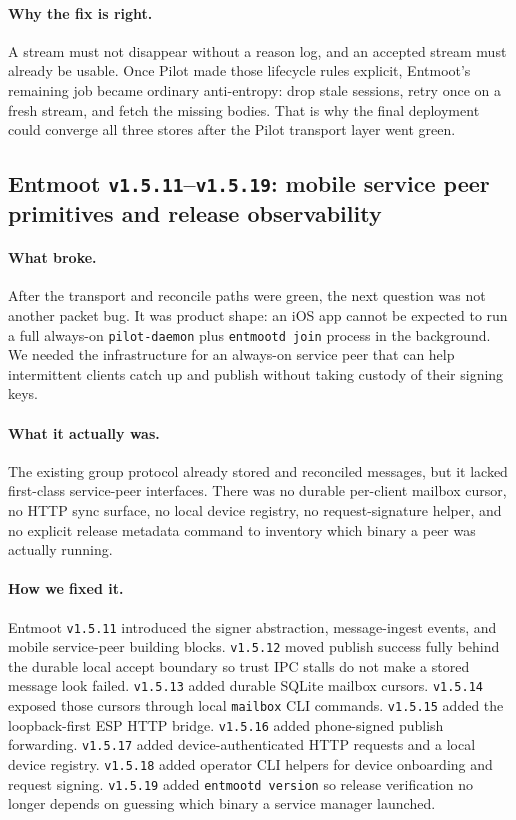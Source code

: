 \documentclass[11pt,a4paper]{article}
\begin{document}
\paragraph{Why the fix is right.} A stream must not disappear without a
reason log, and an accepted stream must already be usable. Once Pilot
made those lifecycle rules explicit, Entmoot's remaining job became
ordinary anti-entropy: drop stale sessions, retry once on a fresh
stream, and fetch the missing bodies. That is why the final deployment
could converge all three stores after the Pilot transport layer went
green.

\subsection{Entmoot \texttt{v1.5.11}--\texttt{v1.5.19}: mobile service
peer primitives and release observability}

\paragraph{What broke.} After the transport and reconcile paths were
green, the next question was not another packet bug. It was product
shape: an iOS app cannot be expected to run a full always-on
\texttt{pilot-daemon} plus \texttt{entmootd join} process in the
background. We needed the infrastructure for an always-on service peer
that can help intermittent clients catch up and publish without taking
custody of their signing keys.

\paragraph{What it actually was.} The existing group protocol already
stored and reconciled messages, but it lacked first-class service-peer
interfaces. There was no durable per-client mailbox cursor, no HTTP
sync surface, no local device registry, no request-signature helper,
and no explicit release metadata command to inventory which binary a
peer was actually running.

\paragraph{How we fixed it.} Entmoot \texttt{v1.5.11} introduced the
signer abstraction, message-ingest events, and mobile service-peer
building blocks. \texttt{v1.5.12} moved publish success fully behind
the durable local accept boundary so trust IPC stalls do not make a
stored message look failed. \texttt{v1.5.13} added durable SQLite
mailbox cursors. \texttt{v1.5.14} exposed those cursors through local
\texttt{mailbox} CLI commands. \texttt{v1.5.15} added the loopback-first
ESP HTTP bridge. \texttt{v1.5.16} added phone-signed publish forwarding.
\texttt{v1.5.17} added device-authenticated HTTP requests and a local
device registry. \texttt{v1.5.18} added operator CLI helpers for device
onboarding and request signing. \texttt{v1.5.19} added
\texttt{entmootd version} so release verification no longer depends on
guessing which binary a service manager launched.
\end{document}
